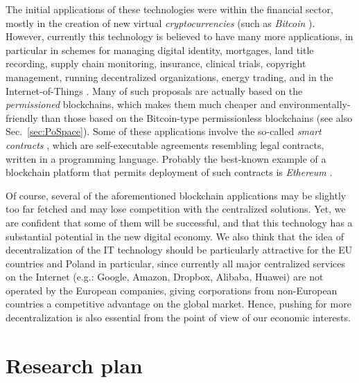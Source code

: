 \documentclass{article}
\begin{document}
The initial applications of these technologies were within the financial sector, mostly in the creation of new virtual \emph{cryptocurrencies} (such as \emph{Bitcoin} \cite{nakamoto2008bitcoin}). However, currently this technology is believed to have many more applications, in particular in schemes for managing digital identity, mortgages, land title recording, supply chain monitoring, insurance, 
clinical trials, copyright management, running decentralized organizations, energy trading, and in the Internet-of-Things \cite{econ3,forbes,econ2,Underwood:2016:BBB:3013530.2994581,EY,ibm,Microsoft5,DHL,chamber,capgemini,pwc,EY,DHL,iot,economist-dao,pwc2}. Many of such proposals are actually based on the \emph{permissioned} blockchains, which makes them much cheaper and environmentally-friendly than those based on the Bitcoin-type permissionless blockchains (see also Sec.~\ref{sec:PoSpace}). Some of these applications involve the so-called \emph{smart contracts} \cite{Szabo}, which are self-executable agreements resembling legal contracts, written in a programming language. Probably the best-known example of a blockchain platform that permits deployment of such contracts is \emph{Ethereum} \cite{Ethereum}. 

Of course, several of the aforementioned blockchain applications may be slightly too far fetched and may lose competition with the centralized solutions. Yet, we are confident that some of them will be successful, and that this technology has a substantial potential in the new digital economy. We also think that the idea of decentralization of the IT technology should be particularly attractive for the EU countries and Poland in particular, since currently all major centralized services on the Internet (e.g.: Google, Amazon, Dropbox, Alibaba, Huawei) are not operated by the European companies, giving corporations from non-European countries a competitive advantage on the global market. Hence, pushing for more decentralization is also essential from the point of view of our economic interests.

\section{Research plan}
\end{document}
